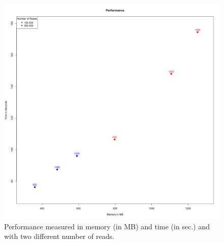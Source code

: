 \documentclass[10pt,a4paper]{article}
\begin{document}
\newpage
\begin{figure}[!ht]
\centering
\includegraphics[width=\textwidth]{../output/plots/plotPerformance}
\caption{\footnotesize Performance measured in memory (in MB) and time (in sec.) and with two different number of reads.}
\end{figure}
\end{document}
